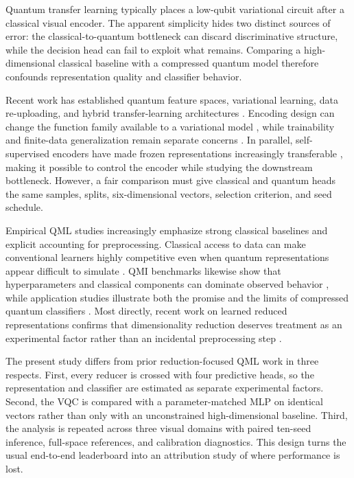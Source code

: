 \documentclass[pdflatex,sn-mathphys-ay]{sn-jnl}
\begin{document}
Quantum transfer learning typically places a low-qubit variational circuit after a classical visual encoder. The apparent simplicity hides two distinct sources of error: the classical-to-quantum bottleneck can discard discriminative structure, while the decision head can fail to exploit what remains. Comparing a high-dimensional classical baseline with a compressed quantum model therefore confounds representation quality and classifier behavior.


Recent work has established quantum feature spaces, variational learning, data re-uploading, and hybrid transfer-learning architectures \citep{SCHULD-KILLORAN-2019,HAVLICEK-2019,PEREZ-SALINAS-2020,MARI-2020,ABBAS-2021,CEREZO-VQA-2021,CEREZO-CHALLENGES-2022}. Encoding design can change the function family available to a variational model \citep{SCHULD-SWEKE-MEYER-2021}, while trainability and finite-data generalization remain separate concerns \citep{DU-2021,CARO-2022,GIL-FUSTER-2024}. In parallel, self-supervised encoders have made frozen representations increasingly transferable \citep{DINOV2-2024}, making it possible to control the encoder while studying the downstream bottleneck. However, a fair comparison must give classical and quantum heads the same samples, splits, six-dimensional vectors, selection criterion, and seed schedule.


Empirical QML studies increasingly emphasize strong classical baselines and explicit accounting for preprocessing. Classical access to data can make conventional learners highly competitive even when quantum representations appear difficult to simulate \citep{HUANG-2021}. QMI benchmarks likewise show that hyperparameters and classical components can dominate observed behavior \citep{EGGINGER-2024,SCHNABEL-ROTH-2025}, while application studies illustrate both the promise and the limits of compressed quantum classifiers \citep{MANGINI-2022,WANG-2025}. Most directly, recent work on learned reduced representations confirms that dimensionality reduction deserves treatment as an experimental factor rather than an incidental preprocessing step \citep{ODAGIU-2025}.


The present study differs from prior reduction-focused QML work in three respects. First, every reducer is crossed with four predictive heads, so the representation and classifier are estimated as separate experimental factors. Second, the VQC is compared with a parameter-matched MLP on identical vectors rather than only with an unconstrained high-dimensional baseline. Third, the analysis is repeated across three visual domains with paired ten-seed inference, full-space references, and calibration diagnostics. This design turns the usual end-to-end leaderboard into an attribution study of where performance is lost.
\end{document}
